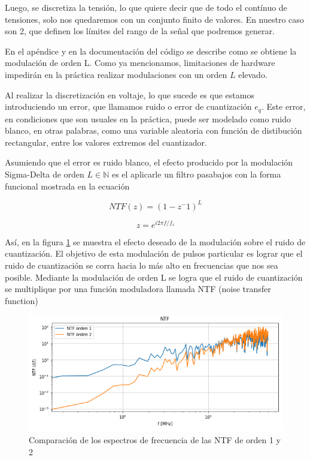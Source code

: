 \documentclass[twoside]{article}
\begin{document}
\begin{multicols}{2}
Luego, se discretiza la tensión, lo que quiere decir que de todo el contínuo de tensiones, solo nos quedaremos con un conjunto finito de valores. En nuestro caso son 2, que definen los límites del rango de la señal que podremos generar.

En el apéndice y en la documentación del código se describe como se obtiene la modulación de orden L. Como ya mencionamos, limitaciones de hardware impedirán en la práctica realizar modulaciones con un orden $L$ elevado.


Al realizar la discretización en voltaje, lo que sucede es que estamos introduciendo un error, que llamamos ruido o error de cuantización $e_q$. Este error, en condiciones que son usuales en la práctica, puede ser modelado como ruido blanco, en otras palabras, como una variable aleatoria con función de distibución rectangular, entre los valores extremos del cuantizador. 
 
Asumiendo que el error es ruido blanco, el efecto producido por la modulación Sigma-Delta de orden $L\in\mathbb{N}$ es el aplicarle un filtro pasabajos con la forma funcional mostrada en la ecuación 
 
\begin{equation}
    NTF(z) = (1-z^-1)^L
    \label{eq:ntf}
\end{equation}

\begin{equation}
    z = e^{i2\pi f/f_s}
\end{equation}

Así, en la figura \ref{fig:NTF_spec} se muestra el efecto deseado de la modulación sobre el ruido de cuantización. El objetivo de esta modulación de pulsos particular es lograr que el ruido de cuantización se corra hacia lo más alto en frecuencias que nos sea posible. Mediante la modulación de orden L se logra que el ruido de cuantización se multiplique por una función moduladora llamada NTF (noise transfer function)

\begin{figure}[H]
\centering
\includegraphics[width=\linewidth]{figuras/NTFs_espectro.png}
\caption{Comparación de los espectros de frecuencia de las NTF de orden 1 y 2}
\label{fig:NTF_spec}
\end{figure}


\end{multicols}
\end{document}
